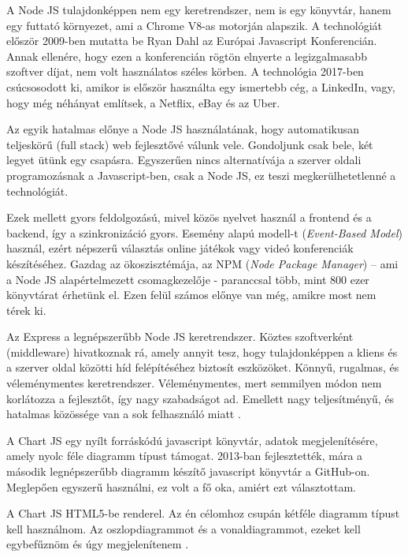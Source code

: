 A Node JS tulajdonképpen nem egy keretrendszer, nem is egy könyvtár, hanem egy futtató környezet, ami a Chrome V8-as motorján alapszik. A technológiát először 2009-ben mutatta be Ryan Dahl az Európai Javascript Konferencián. Annak ellenére, hogy ezen a konferencián rögtön elnyerte a legizgalmasabb szoftver díjat, nem volt használatos széles körben. A technológia 2017-ben csúcsosodott ki, amikor is először használta egy ismertebb cég, a LinkedIn, vagy, hogy még néhányat említsek, a Netflix, eBay és az Uber.

Az egyik hatalmas előnye a Node JS használatának, hogy automatikusan teljeskörű (full stack) web fejlesztővé válunk vele. Gondoljunk csak bele, két legyet ütünk egy csapásra. Egyszerűen nincs alternatívája a szerver oldali programozásnak a Javascript-ben, csak a Node JS, ez teszi megkerülhetetlenné a technológiát.

Ezek mellett gyors feldolgozású, mivel közös nyelvet használ a frontend és a backend, így a szinkronizáció gyors. Esemény alapú modell-t (\textit{Event-Based Model}) használ, ezért népszerű választás online játékok vagy videó konferenciák készítéséhez. Gazdag az ökoszisztémája, az NPM (\textit{Node Package Manager}) -- ami a Node JS alapértelmezett csomagkezelője - paranccsal több, mint 800 ezer könyvtárat érhetünk el. Ezen felül számos előnye van még, amikre most nem térek ki.

Az Express a legnépszerűbb Node JS keretrendszer. Köztes szoftverként (middleware) hivatkoznak rá, amely annyit tesz, hogy tulajdonképpen a kliens és a szerver oldal közötti híd felépítéséhez biztosít eszközöket. Könnyű, rugalmas, és véleménymentes keretrendszer. Véleménymentes, mert semmilyen módon nem korlátozza a fejlesztőt, így nagy szabadságot ad. Emellett nagy teljesítményű, és hatalmas közössége van a sok felhasználó miatt
\cite{node}.


A Chart JS egy nyílt forráskódú javascript könyvtár, adatok megjelenítésére, amely nyolc féle diagramm típust támogat. 2013-ban fejlesztették, mára a második legnépszerűbb diagramm készítő javascript könyvtár a GitHub-on. Meglepően egyszerű használni, ez volt a fő oka, amiért ezt választottam. 

A Chart JS HTML5-be renderel. Az én célomhoz csupán kétféle diagramm típust kell használnom. Az oszlopdiagrammot és a vonaldiagrammot, ezeket kell egybefűznöm és úgy megjelenítenem
\cite{chartjs}.


